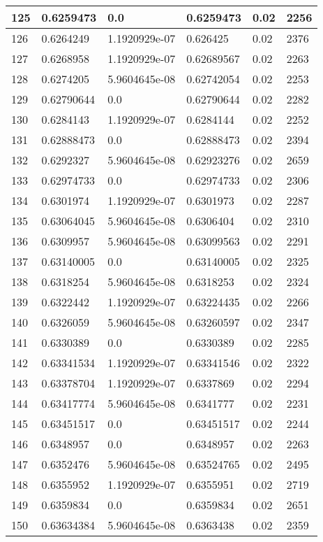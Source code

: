 \begin{longtable}{|l|l|l|l|l|l|}
125 & 0.6259473 & 0.0 & 0.6259473 & 0.02 & 2256 \\ \hline 
126 & 0.6264249 & 1.1920929e-07 & 0.626425 & 0.02 & 2376 \\ \hline 
127 & 0.6268958 & 1.1920929e-07 & 0.62689567 & 0.02 & 2263 \\ \hline 
128 & 0.6274205 & 5.9604645e-08 & 0.62742054 & 0.02 & 2253 \\ \hline 
129 & 0.62790644 & 0.0 & 0.62790644 & 0.02 & 2282 \\ \hline 
130 & 0.6284143 & 1.1920929e-07 & 0.6284144 & 0.02 & 2252 \\ \hline 
131 & 0.62888473 & 0.0 & 0.62888473 & 0.02 & 2394 \\ \hline 
132 & 0.6292327 & 5.9604645e-08 & 0.62923276 & 0.02 & 2659 \\ \hline 
133 & 0.62974733 & 0.0 & 0.62974733 & 0.02 & 2306 \\ \hline 
134 & 0.6301974 & 1.1920929e-07 & 0.6301973 & 0.02 & 2287 \\ \hline 
135 & 0.63064045 & 5.9604645e-08 & 0.6306404 & 0.02 & 2310 \\ \hline 
136 & 0.6309957 & 5.9604645e-08 & 0.63099563 & 0.02 & 2291 \\ \hline 
137 & 0.63140005 & 0.0 & 0.63140005 & 0.02 & 2325 \\ \hline 
138 & 0.6318254 & 5.9604645e-08 & 0.6318253 & 0.02 & 2324 \\ \hline 
139 & 0.6322442 & 1.1920929e-07 & 0.63224435 & 0.02 & 2266 \\ \hline 
140 & 0.6326059 & 5.9604645e-08 & 0.63260597 & 0.02 & 2347 \\ \hline 
141 & 0.6330389 & 0.0 & 0.6330389 & 0.02 & 2285 \\ \hline 
142 & 0.63341534 & 1.1920929e-07 & 0.63341546 & 0.02 & 2322 \\ \hline 
143 & 0.63378704 & 1.1920929e-07 & 0.6337869 & 0.02 & 2294 \\ \hline 
144 & 0.63417774 & 5.9604645e-08 & 0.6341777 & 0.02 & 2231 \\ \hline 
145 & 0.63451517 & 0.0 & 0.63451517 & 0.02 & 2244 \\ \hline 
146 & 0.6348957 & 0.0 & 0.6348957 & 0.02 & 2263 \\ \hline 
147 & 0.6352476 & 5.9604645e-08 & 0.63524765 & 0.02 & 2495 \\ \hline 
148 & 0.6355952 & 1.1920929e-07 & 0.6355951 & 0.02 & 2719 \\ \hline 
149 & 0.6359834 & 0.0 & 0.6359834 & 0.02 & 2651 \\ \hline 
150 & 0.63634384 & 5.9604645e-08 & 0.6363438 & 0.02 & 2359 \\ \hline 
\end{longtable}